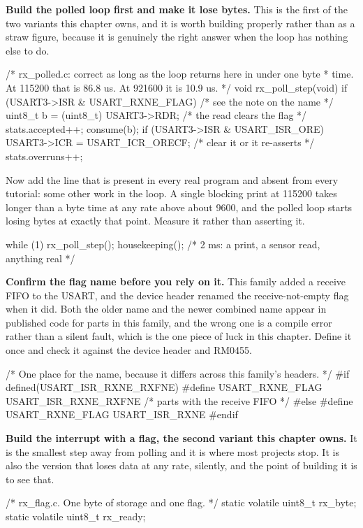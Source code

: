 \begin{steps}
\item \textbf{Build the polled loop first and make it lose bytes.} This is the
first of the two variants this chapter owns, and it is worth building properly
rather than as a straw figure, because it is genuinely the right answer when the
loop has nothing else to do.
\begin{ccode}
/* rx_polled.c: correct as long as the loop returns here in under one byte
 * time. At 115200 that is 86.8 us. At 921600 it is 10.9 us. */
void rx_poll_step(void)
{
    if (USART3->ISR & USART_RXNE_FLAG) {      /* see the note on the name */
        uint8_t b = (uint8_t) USART3->RDR;    /* the read clears the flag */
        stats.accepted++;
        consume(b);
    }
    if (USART3->ISR & USART_ISR_ORE) {
        USART3->ICR = USART_ICR_ORECF;        /* clear it or it re-asserts */
        stats.overruns++;
    }
}
\end{ccode}
Now add the line that is present in every real program and absent from every
tutorial: some other work in the loop. A single blocking print at 115200 takes
longer than a byte time at any rate above about 9600, and the polled loop starts
losing bytes at exactly that point. Measure it rather than asserting it.
\begin{ccode}
while (1) {
    rx_poll_step();
    housekeeping();        /* 2 ms: a print, a sensor read, anything real */
}
\end{ccode}

\item \textbf{Confirm the flag name before you rely on it.} This family added a
receive FIFO to the USART, and the device header renamed the receive-not-empty
flag when it did. Both the older name and the newer combined name appear in
published code for parts in this family, and the wrong one is a compile error
rather than a silent fault, which is the one piece of luck in this chapter.
Define it once and check it against the device header and RM0455.
\begin{ccode}
/* One place for the name, because it differs across this family's headers. */
#if defined(USART_ISR_RXNE_RXFNE)
#define USART_RXNE_FLAG USART_ISR_RXNE_RXFNE   /* parts with the receive FIFO */
#else
#define USART_RXNE_FLAG USART_ISR_RXNE
#endif
\end{ccode}

\item \textbf{Build the interrupt with a flag, the second variant this chapter
owns.} It is the smallest step away from polling and it is where most projects
stop. It is also the version that loses data at any rate, silently, and the
point of building it is to see that.
\begin{ccode}
/* rx_flag.c. One byte of storage and one flag. */
static volatile uint8_t rx_byte;
static volatile uint8_t rx_ready;


\end{ccode}
\end{steps}
